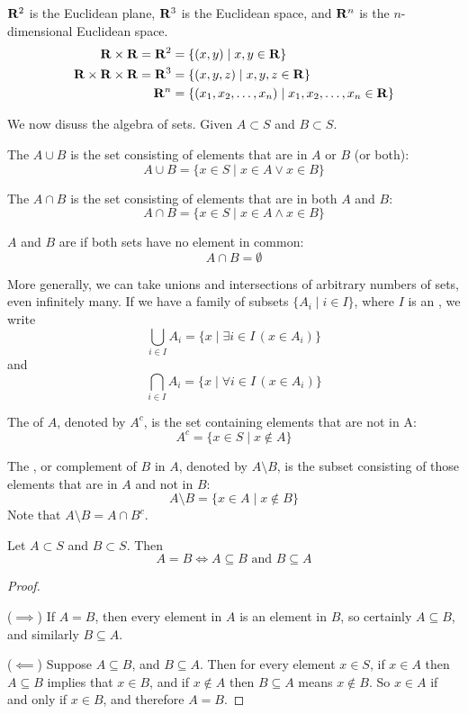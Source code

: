 \begin{example}
$\mathbf R^2$ is the Euclidean plane, $\mathbf R^3$ is the Euclidean space, and $\mathbf R^n$ is the $n$-dimensional Euclidean space.
\begin{align*}
\mathbf R \times \mathbf R = \mathbf R^2 &= \{(x,y) \mid x,y \in \mathbf R\} \\
\mathbf R \times \mathbf R \times \mathbf R = \mathbf R^3 &= \{(x,y,z) \mid x,y,z \in \mathbf R\} \\
\mathbf R^n &= \{(x_1,x_2,\dots,x_n) \mid x_1,x_2,\dots,x_n \in \mathbf R\}
\end{align*}
\end{example}

We now disuss the algebra of sets. Given $A \subset S$ and $B \subset S$.

The  $A \cup B$ is the set consisting of elements that are in $A$ or $B$ (or both):
\[ A\cup B=\{x \in S \mid x\in A \lor x\in B\} \]

The  $A \cap B$ is the set consisting of elements that are in both $A$ and $B$:
\[ A\cap B=\{x \in S \mid x\in A \land x\in B\} \]

$A$ and $B$ are  if both sets have no element in common:
\[ A\cap B = \emptyset \]

More generally, we can take unions and intersections of arbitrary numbers of sets, even infinitely many. If we have a family of subsets $\{A_i \mid i \in I\}$, where $I$ is an , we write
\[ \bigcup_{i\in I} A_i = \{x \mid \exists i\in I\,(x\in A_i)\} \]
and
\[ \bigcap_{i\in I} A_i = \{x \mid \forall i\in I\,(x\in A_i)\} \] 

The  of $A$, denoted by $A^c$, is the set containing elements that are not in A:
\[ A^c = \{x \in S \mid x \notin A\} \]

The , or complement of $B$ in $A$, denoted by $A\setminus B$, is the subset consisting of those elements that are in $A$ and not in $B$:
\[ A\setminus B = \{x \in A \mid x \notin B\} \]
Note that $A\setminus B = A \cap B^c$.

\begin{proposition}
Let $A\subset S$ and $B\subset S$. Then 
\begin{equation}
A = B \iff A \subseteq B \text{ and } B \subseteq A
\end{equation}
\end{proposition}

\begin{proof} \

($\implies$) If $A = B$, then every element in $A$ is an element in $B$, so certainly $A \subseteq B$, and
similarly $B \subseteq A$. 

($\impliedby$) Suppose $A \subseteq B$, and $B \subseteq A$. Then for every element $x \in S$, if $x \in A$ then $A \subseteq B$ implies that $x \in B$, and if $x \notin A$ then $B \subseteq A$ means $x \notin B$. So $x \in A$ if and only if $x \in B$, and therefore $A = B$.
\end{proof}

